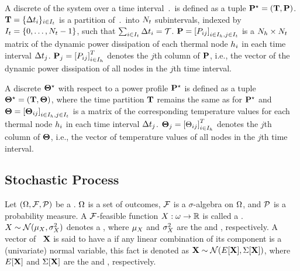A discrete  of the system over a time interval $\period$ is defined as a tuple $\mathbf{P}^\star = (\mathbf{T}, \mathbf{P})$. $\mathbf{T} = \{ \Delta t_i \}_{i \in I_t}$ is a partition of $\period$ into $N_t$ subintervals, indexed by $I_t = \{ 0, \dots, N_t - 1 \}$, such that $\sum_{i \in I_t} \Delta t_i = \mathcal{T}$. $\mathbf{P} = \left[P_{ij}\right]_{i \in I_h, j \in I_t}$ is a $N_h \times N_t$ matrix of the dynamic power dissipation of each thermal node $h_i$ in each time interval $\Delta t_j$. $\mathbf{P}_j = \left[P_{ij}\right]^T_{i \in I_h}$ denotes the $j$th column of $\mathbf{P}$, i.e., the vector of the dynamic power dissipation of all nodes in the $j$th time interval.

A discrete  $\mathbf{\Theta}^\star$ with respect to a power profile $\mathbf{P}^\star$ is defined as a tuple $\mathbf{\Theta}^\star = (\mathbf{T}, \mathbf{\Theta})$, where the time partition $\mathbf{T}$ remains the same as for $\mathbf{P}^\star$ and $\mathbf{\Theta} = \left[\mathbf{\Theta}_{ij}\right]_{i \in I_h, j \in I_t}$ is a matrix of the corresponding temperature values for each thermal node $h_i$ in each time interval $\Delta t_j$. $\mathbf{\Theta}_j = \left[\Theta_{ij}\right]^T_{i \in I_h}$ denotes the $j$th column of $\mathbf{\Theta}$, i.e., the vector of temperature values of all nodes in the $j$th time interval.

\subsection{Stochastic Process}
Let $(\Omega, \mathcal{F}, \mathcal{P})$ be a  \cite{oksendal2003}. $\Omega$ is a set of outcomes, $\mathcal{F}$ is a $\sigma$-algebra on $\Omega$, and $\mathcal{P}$ is a probability measure. A $\mathcal{F}$-feasible function $X: \omega \to \mathbb{R}$ is called a . $X \sim \mathcal{N}(\mu_{X}, \sigma_{X}^2)$ denotes a , where $\mu_{X}$ and $\sigma_{X}^2$ are the  and , respectively. A vector of \rvs\ $\mathbf{X}$ is said to have a  if any linear combination of its component is a (univariate) normal variable, this fact is denoted as $\mathbf{X} \sim \mathcal{N}(E[\mathbf{X}], \Sigma[\mathbf{X}])$, where $E[\mathbf{X}]$ and $\Sigma[\mathbf{X}]$ are the  and , respectively.


